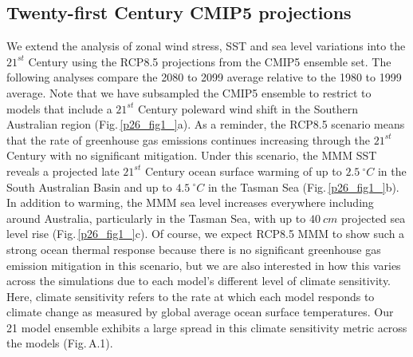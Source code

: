 \documentclass[draft,linenumbers]{agujournal2018}
\begin{document}
\subsection{Twenty-first Century CMIP5 projections}
We extend the analysis of zonal wind stress, SST and sea level variations into the $21^{st}$ Century using the RCP8.5 projections from the CMIP5 ensemble set. The following analyses compare the 2080 to 2099 average relative to the 1980 to 1999 average. Note that we have subsampled the CMIP5 ensemble to restrict to models that include a $21^{st}$ Century poleward wind shift in the Southern Australian region (Fig.\,\ref{p26_fig1_}a). As a reminder, the RCP8.5 scenario means that the rate of greenhouse gas emissions continues increasing through the $21^{st}$ Century with no significant mitigation. Under this scenario, the MMM SST reveals a projected late $21^{st}$ Century ocean surface warming of up to $2.5\ ^{\circ}C$ in the South Australian Basin and up to $4.5\ ^{\circ}C$ in the Tasman Sea (Fig.\,\ref{p26_fig1_}b). In addition to warming, the MMM sea level increases everywhere including around Australia, particularly in the Tasman Sea, with up to $40\ cm$ projected sea level rise (Fig.\,\ref{p26_fig1_}c). Of course, we expect RCP8.5 MMM to show such a strong ocean thermal response because there is no significant greenhouse gas emission mitigation in this scenario, but we are also interested in how this varies across the simulations due to each model's different level of climate sensitivity. Here, climate sensitivity refers to the rate at which each model responds to climate change as measured by global average ocean surface temperatures. Our 21 model ensemble exhibits a large spread in this climate sensitivity metric across the models (Fig.\,A.1).
\end{document}
